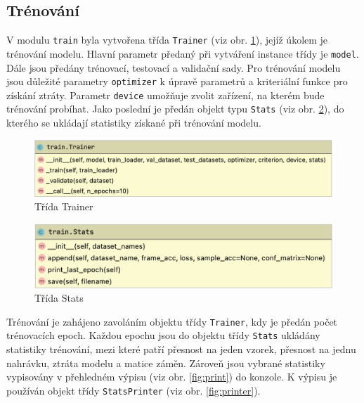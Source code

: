 \documentclass[FM,BP]{tulthesis}
\begin{document}
\subsection{Trénování} %
V modulu \texttt{\mbox{train}} byla vytvořena třída \texttt{\mbox{Trainer}} (viz obr. \mbox{\ref{fig:trainer}}), jejíž úkolem je trénování modelu. Hlavní parametr předaný při vytváření instance třídy je \texttt{\mbox{model}}. Dále jsou předány trénovací, testovací a validační sady. Pro trénování modelu jsou důležité parametry \texttt{\mbox{optimizer}} k úpravě parametrů a kriteriální funkce pro získání ztráty. Parametr \texttt{\mbox{device}} umožňuje zvolit zařízení, na kterém bude trénování probíhat. Jako poslední je předán objekt typu \texttt{\mbox{Stats}} (viz obr. \mbox{\ref{fig:stats}}), do kterého se ukládají statistiky získané při trénování modelu. 

\begin{figure}[ht]
\centerline{\includegraphics[scale=.3]{train-trainer.png}}
\caption{Třída Trainer}
\label{fig:trainer}
\end{figure}
\FloatBarrier

\begin{figure}[ht]
\centerline{\includegraphics[scale=.33]{train-stats.png}}
\caption{Třída Stats}
\label{fig:stats}
\end{figure}
\FloatBarrier

Trénování je zahájeno zavoláním objektu třídy \texttt{\mbox{Trainer}}, kdy je předán počet trénovacích epoch. Každou epochu jsou do objektu třídy \texttt{\mbox{Stats}} ukládány statistiky trénování, mezi které patří přesnost na jeden vzorek, přesnost na jednu nahrávku, ztráta modelu a matice záměn. Zároveň jsou vybrané statistiky vypisovány v přehledném výpisu (viz obr. \mbox{\ref{fig:print}}) do konzole. K výpisu je používán objekt třídy \texttt{\mbox{StatsPrinter}} (viz obr. \mbox{\ref{fig:printer}}).
\end{document}
